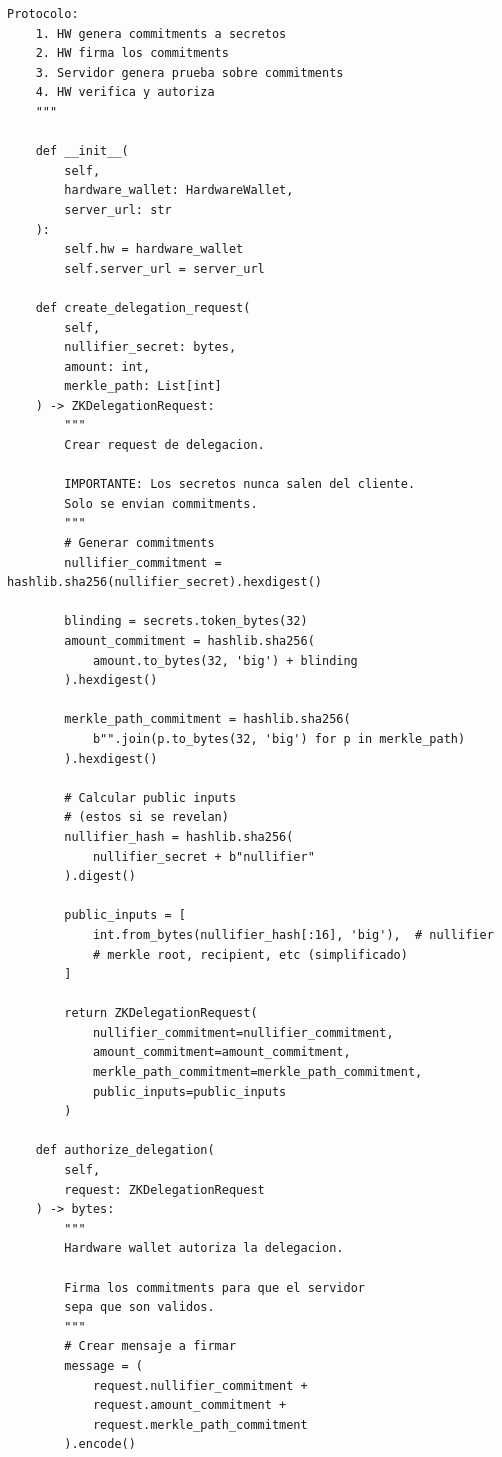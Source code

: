 \documentclass[11pt,a4paper,twoside]{book}
\theoremstyle{definition}
\theoremstyle{remark}
\begin{document}
\begin{lstlisting}[style=python, caption={Integración de hardware wallet con ZK}]
    Protocolo:
    1. HW genera commitments a secretos
    2. HW firma los commitments
    3. Servidor genera prueba sobre commitments
    4. HW verifica y autoriza
    """
    
    def __init__(
        self,
        hardware_wallet: HardwareWallet,
        server_url: str
    ):
        self.hw = hardware_wallet
        self.server_url = server_url
        
    def create_delegation_request(
        self,
        nullifier_secret: bytes,
        amount: int,
        merkle_path: List[int]
    ) -> ZKDelegationRequest:
        """
        Crear request de delegacion.
        
        IMPORTANTE: Los secretos nunca salen del cliente.
        Solo se envian commitments.
        """
        # Generar commitments
        nullifier_commitment = hashlib.sha256(nullifier_secret).hexdigest()
        
        blinding = secrets.token_bytes(32)
        amount_commitment = hashlib.sha256(
            amount.to_bytes(32, 'big') + blinding
        ).hexdigest()
        
        merkle_path_commitment = hashlib.sha256(
            b"".join(p.to_bytes(32, 'big') for p in merkle_path)
        ).hexdigest()
        
        # Calcular public inputs
        # (estos si se revelan)
        nullifier_hash = hashlib.sha256(
            nullifier_secret + b"nullifier"
        ).digest()
        
        public_inputs = [
            int.from_bytes(nullifier_hash[:16], 'big'),  # nullifier
            # merkle root, recipient, etc (simplificado)
        ]
        
        return ZKDelegationRequest(
            nullifier_commitment=nullifier_commitment,
            amount_commitment=amount_commitment,
            merkle_path_commitment=merkle_path_commitment,
            public_inputs=public_inputs
        )
    
    def authorize_delegation(
        self,
        request: ZKDelegationRequest
    ) -> bytes:
        """
        Hardware wallet autoriza la delegacion.
        
        Firma los commitments para que el servidor
        sepa que son validos.
        """
        # Crear mensaje a firmar
        message = (
            request.nullifier_commitment +
            request.amount_commitment +
            request.merkle_path_commitment
        ).encode()
        

\end{lstlisting}
\end{document}
